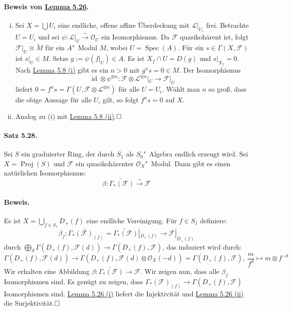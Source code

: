\documentclass[11pt,b5paper,openany]{memoir}
\def \qed {$\hfill\square$}
\begin{document}
\paragraph{Beweis von \hyperref[5.26]{Lemma 5.26}.} \begin{enumerate}[(i)]
\item Sei $X=\bigcup U_i$ eine endliche, offene affine Überdeckung mit $\mathcal{L}|_{U_i}$ frei. Betrachte $U=U_i$ und sei $\psi:\mathcal{L}|_U\stackrel{\sim}{\to}\mathcal{O}_U$ ein Isomorphismus. Da $\mathcal{F}$ quasikohärent ist, folgt $\mathcal{F}|_U\cong\widetilde{M}$ für ein $A$"~Modul $M$, wobei $U=\operatorname{Spec}(A)$. Für ein $s\in\Gamma(X,\mathcal{F})$ ist $s|_U\in M$. Setze $g:=\psi(f|_U)\in A$. Es ist $X_f\cap U=D(g)$ und $s|_{X_f}=0$. Nach \hyperref[5.8]{Lemma 5.8 (i)} gibt es ein $n>0$ mit $g^ns=0\in M$. Der Isomorphismus
\[\operatorname{id}\otimes \psi^{\otimes n}:\mathcal{F}\otimes \mathcal{L}^{\otimes n}|_U\to\mathcal{F}|_U \]
liefert $0=f^ns=\Gamma(U, \mathcal{F}\otimes\mathcal{L}^{\otimes n})$ für alle $U=U_i$. Wählt man $n$ so groß, dass die obige Aussage für alle $U_i$ gilt, so folgt $f^ns=0$ auf $X$.
\item Analog zu (i) mit \hyperref[5.8]{Lemma 5.8 (ii)}.\qed
\end{enumerate}

\paragraph{Satz 5.28.}\label{5.28} Sei $S$ ein graduierter Ring, der durch $S_1$ als $S_0$"~Algebra endlich erzeugt wird. Sei $X=\operatorname{Proj}(S)$ und $\mathcal{F}$ ein quasikohärenter $\mathcal{O}_X$"~Modul. Dann gibt es einen natürlichen Isomorphismus:
\[\beta:\widetilde{\Gamma_\ast(\mathcal{F})}\stackrel{\sim}{\to}\mathcal{F} \]

\paragraph{Beweis.} Es ist $X=\bigcup_{f\in S_1}D_+(f)$ eine endliche Vereinigung. Für $f\in S_1$ definiere:
\[\beta_f:\widetilde{\Gamma_\ast(\mathcal{F})_{(f)}}=\widetilde{\Gamma_\ast(\mathcal{F})}|_{D_+(f)}\to\mathcal{F}|_{D_+(f)} \]
durch $\bigoplus_d\Gamma(D_+(f),\mathcal{F}(d))\to\Gamma(D_+(f),\mathcal{F})$, das induziert wird durch:
\[\Gamma(D_+(f),\mathcal{F}(d))\to\Gamma(D_+(f),\mathcal{F}(d)\otimes \mathcal{O}_X(-d))= \Gamma(D_+(f),\mathcal{F}),\ \frac{m}{f^d}\mapsto m\otimes f^{-d} \]
Wir erhalten eine Abbildung $\beta:\widetilde{\Gamma_\ast(\mathcal{F})}\to\mathcal{F}$. Wir zeigen nun, dass alle $\beta_f$ Isomorphismen sind. Es genügt zu zeigen, dass $\Gamma_\ast(\mathcal{F})_{(f)}\to\Gamma(D_+(f),\mathcal{F})$ Isomorphismen sind. \hyperref[5.26]{Lemma 5.26 (i)} liefert die Injektivität und \hyperref[5.26]{Lemma 5.26 (ii)} die Surjektivität.\qed
\end{document}
